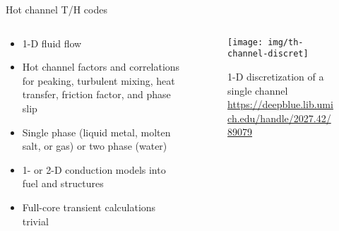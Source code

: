\documentclass[pdf,aspectratio=169]{beamer}
\begin{document}
\begin{frame}{Hot channel T/H codes}
\begin{columns}
    \begin{column}{0.7\textwidth}
            \begin{itemize}
                \item 1-D fluid flow
                \item Hot channel factors and correlations for peaking, turbulent mixing,
                    heat transfer, friction factor, and phase slip
                \item Single phase (liquid metal, molten salt, or gas) or two phase (water)
                \item 1- or 2-D conduction models into fuel and structures
                \item Full-core transient calculations trivial
            \end{itemize}
    \end{column}
    \begin{column}{0.3\textwidth}
        \begin{figure}[ht]
        \centering
            \texttt{[image: img/th-channel-discret]}
            \caption{\tiny 1-D discretization of a single channel \url{https://deepblue.lib.umich.edu/handle/2027.42/89079}}
        \end{figure}
    \end{column}
\end{columns}
\end{frame}
\end{document}
